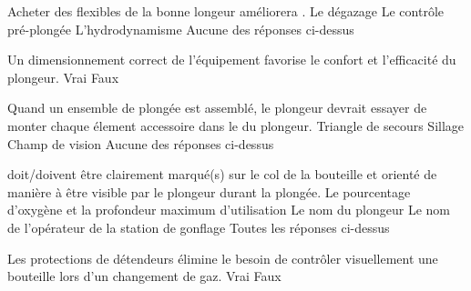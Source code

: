 \documentclass[english,12pt,a4paper]{article}
\begin{document}
\begin{outline}
		\1 Acheter des flexibles de la bonne longeur améliorera \underline{\hspace{1.5cm}}.
			\2 Le dégazage
			\2 Le contrôle pré-plongée
			\2 L'hydrodynamisme
			\2 Aucune des réponses ci-dessus

		\1 Un dimensionnement correct de l'équipement favorise le confort et l'efficacité du plongeur.
			\2 Vrai
			\2 Faux

		\1 Quand un ensemble de plongée est assemblé, le plongeur devrait essayer de monter chaque élement accessoire dans le \underline{\hspace{1.5cm}} du plongeur.
			\2 Triangle de secours
			\2 Sillage
			\2 Champ de vision
			\2 Aucune des réponses ci-dessus

		\1 \underline{\hspace{1.5cm}} doit/doivent être clairement marqué(s) sur le col de la bouteille et orienté de manière à être visible par le plongeur durant la plongée.
			\2 Le pourcentage d'oxygène et la profondeur maximum d'utilisation
			\2 Le nom du plongeur
			\2 Le nom de l'opérateur de la station de gonflage
			\2 Toutes les réponses ci-dessus

		\1 Les protections de détendeurs élimine le besoin de contrôler visuellement une bouteille lors d'un changement de gaz.
			\2 Vrai
			\2 Faux
	\end{outline}
	\pagebreak

\end{document}
